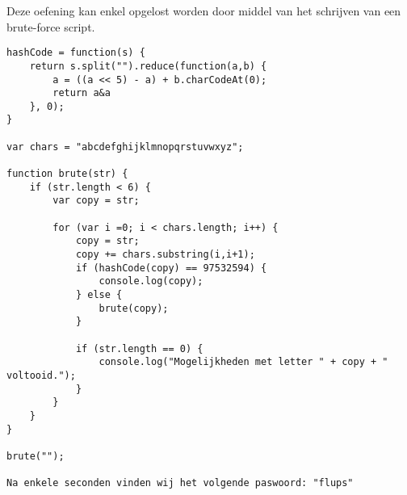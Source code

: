 Deze oefening kan enkel opgelost worden door middel van het schrijven van een brute-force script.
\begin{lstlisting}
hashCode = function(s) {
	return s.split("").reduce(function(a,b) {
		a = ((a << 5) - a) + b.charCodeAt(0);
		return a&a
	}, 0);              
}

var chars = "abcdefghijklmnopqrstuvwxyz";

function brute(str) {
	if (str.length < 6) {
		var copy = str;
		
		for (var i =0; i < chars.length; i++) {
			copy = str;
			copy += chars.substring(i,i+1);
			if (hashCode(copy) == 97532594) {
				console.log(copy);
			} else {
				brute(copy);
			}
			
			if (str.length == 0) {
				console.log("Mogelijkheden met letter " + copy + " voltooid.");
			}
		}
	}
}

brute("");

Na enkele seconden vinden wij het volgende paswoord: "flups"
\end{lstlisting}